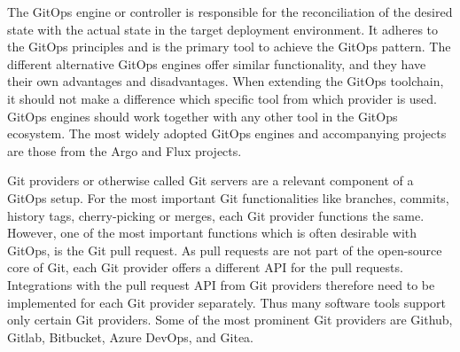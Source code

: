 

The GitOps engine or controller is responsible for the
reconciliation of the desired state with the actual state
in the target deployment environment.
It adheres to the GitOps principles and is the primary tool
to achieve the GitOps pattern.
The different alternative GitOps engines offer similar functionality,
and they have their own advantages and disadvantages.
When extending the GitOps toolchain, it should not make a difference which specific
tool from which provider is used.
GitOps engines should work together with any other tool in the GitOps ecosystem.
The most widely adopted GitOps engines and accompanying projects are those from
the Argo
\autocite{argoProjWebsite}
and Flux
\autocite{fluxWebsite}
projects.









Git providers or otherwise called Git servers are a relevant component of
a GitOps setup.
For the most important Git functionalities like branches, commits, history
tags, cherry-picking or merges, each Git provider functions the same.
However, one of the most important functions which is often desirable with GitOps, is the Git pull request.
As pull requests are not part of the open-source core of Git,
each Git provider offers a different API for the pull requests.
Integrations with the pull request API from Git providers therefore need to be implemented
for each Git provider separately. Thus many software tools support only certain Git providers.
Some of the most prominent Git providers are
Github,
Gitlab,
Bitbucket,
Azure DevOps, and
Gitea.





























